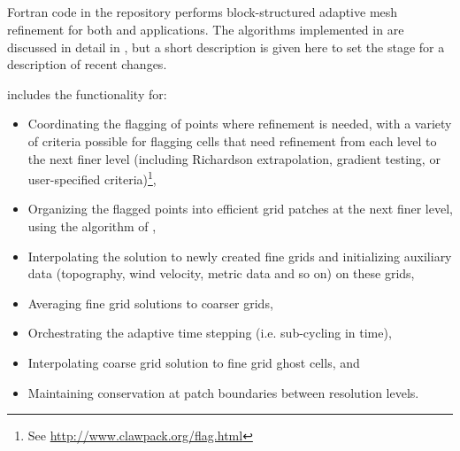 %
%
%

\subsection{\amrclaw} \label{sec:amrclaw}
Fortran code in the \amrclaw repository performs block-structured adaptive mesh
refinement \cite{BO,BC} for both \clawpack and \geoclaw  applications.
The algorithms implemented in \amrclaw are discussed in detail in
\cite{mjb-rjl:amrclaw,LeVequeGeorgeBerger:an11}, but a  short description is
given here to set the stage for a description of recent changes. 



\amrclaw includes the functionality for:
\begin{itemize}
\item Coordinating the flagging of points where refinement is needed,
with a variety of criteria possible for flagging cells that need refinement
from each level to the next finer level (including Richardson extrapolation,
gradient testing, or user-specified criteria)\footnote{See
\url{http://www.clawpack.org/flag.html}},
\item Organizing the flagged points into efficient grid
patches at the next finer level, using the algorithm of
\cite{mjb-rig:cluster},
\item Interpolating the solution to newly created fine grids and initializing
auxiliary data (topography, wind velocity, metric data and so on) on  these
grids,
\item Averaging fine grid solutions to coarser grids,
\item Orchestrating the adaptive time stepping (i.e. sub-cycling in time),
\item Interpolating coarse grid solution to fine grid ghost cells, and
\item Maintaining conservation at patch boundaries between resolution levels.
\end{itemize}

